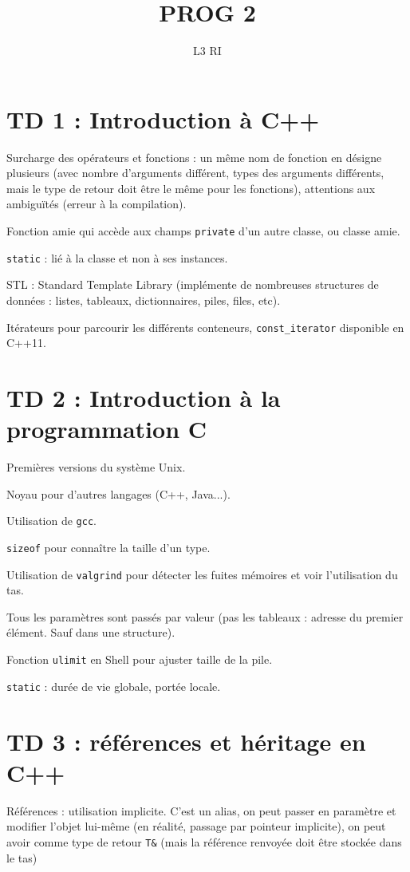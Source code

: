 \documentclass[french]{article}
\title{PROG 2}
\date{}
\author{L3 RI}
\def\code#1{\texttt{#1}}
\begin{document}
\maketitle
\section*{TD 1 : Introduction à C++}
Surcharge des opérateurs et fonctions : un même nom de fonction en désigne plusieurs (avec nombre d'arguments différent, types des arguments différents, mais le type de retour doit être le même pour les fonctions),
attentions aux ambiguïtés (erreur à la compilation).

Fonction amie qui accède aux champs \code{private} d'un autre classe, ou classe amie.

\code{static} : lié à la classe et non à ses instances.

STL : Standard Template Library (implémente de nombreuses structures de données : listes, tableaux, dictionnaires, piles, files, etc).

Itérateurs pour parcourir les différents conteneurs, \code{const\_iterator} disponible en C++11.

\section*{TD 2 : Introduction à la programmation C}
Premières versions du système Unix.

Noyau pour d'autres langages (C++, Java...).

Utilisation de \code{gcc}.

\code{sizeof} pour connaître la taille d'un type.

Utilisation de \code{valgrind} pour détecter les fuites mémoires et voir l'utilisation du tas.

Tous les paramètres sont passés par valeur (pas les tableaux : adresse du premier élément. Sauf dans une structure).

Fonction \code{ulimit} en Shell pour ajuster taille de la pile.

\code{static} : durée de vie globale, portée locale.

\section*{TD 3 : références et héritage en C++}

Références : utilisation implicite. C'est un alias, on peut passer en paramètre et modifier l'objet lui-même (en réalité, passage par pointeur implicite), on peut avoir comme type de retour \code{T\&} (mais la référence renvoyée doit être stockée dans le tas)
\end{document}

